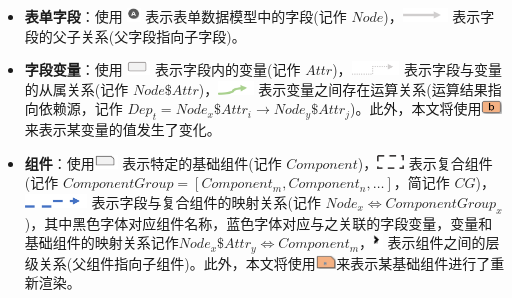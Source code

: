 \documentclass[winfonts,master,twoside]{njuthesis}
\begin{document}
\begin{itemize}
    \item \textbf{表单字段}：使用 \includegraphics[height=1em]{figure/chapter-2/Node.pdf} 表示表单数据模型中的字段(记作 $Node$)，\includegraphics[height=1em]{figure/chapter-2/Tree_Edge.pdf} 表示字段的父子关系(父字段指向子字段)。
    \item \textbf{字段变量}：使用 \includegraphics[height=1em]{figure/chapter-2/Attribute.pdf} 表示字段内的变量(记作 $Attr$)，\includegraphics[height=1em]{figure/chapter-2/Attribute_Edge.pdf} 表示字段与变量的从属关系(记作 $Node\$Attr$)，\includegraphics[height=1em]{figure/chapter-2/Dedenpency_Edge.pdf} 表示变量之间存在运算关系(运算结果指向依赖源，记作 $Dep_t=Node_x\$Attr_i\rightarrow Node_y\$Attr_j$)。此外，本文将使用\includegraphics[height=1em]{figure/chapter-2/update_variable.png}来表示某变量的值发生了变化。
    \item \textbf{组件}：使用\includegraphics[height=1em]{figure/chapter-2/Component.pdf} 表示特定的基础组件(记作 $Component$)，\includegraphics[height=1em]{figure/chapter-2/Component_Group.pdf} 表示复合组件(记作 $ComponentGroup = [Component_m,Component_n,\dots]$，简记作 $CG$)，\includegraphics[height=1em]{figure/chapter-2/Component_Edge.pdf} 表示字段与复合组件的映射关系(记作 $Node_x \Leftrightarrow ComponentGroup_x$)，其中黑色字体对应组件名称，蓝色字体对应与之关联的字段变量，变量和基础组件的映射关系记作$Node_x\$Attr_y\Leftrightarrow Component_m$，\includegraphics[height=1em]{figure/chapter-2/Component_Layer.pdf} 表示组件之间的层级关系(父组件指向子组件)。此外，本文将使用\includegraphics[height=1em]{figure/chapter-2/update_component.png}来表示某基础组件进行了重新渲染。
\end{itemize}
\end{document}
